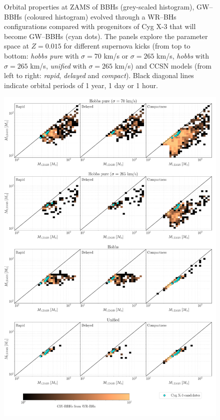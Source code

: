 \documentclass[a4paper,titlepage]{book}     	%
\begin{document}
\begin{appendices}
\begin{figure}
	\caption{Orbital properties at ZAMS of BBHs (grey-scaled histogram), GW--BBHs (coloured histogram) evolved through a WR--BHs configurations compared with progenitors of Cyg X-3 that will become GW--BBHs (cyan dots). The panels explore the parameter space at $Z=0.015$ for different supernova kicks (from top to bottom: \emph{hobbs pure} with $\sigma = 70$ km/s or $\sigma = 265$ km/s, \emph{hobbs} with $\sigma = 265$ km/s, \emph{unified} with $\sigma = 265$ km/s) and CCSN models (from left to right: \emph{rapid}, \emph{delayed} and \emph{compact}). Black diagonal lines indicate orbital periods of 1 year, 1 day or 1 hour.}\label{fig:resultsCygX3progbinaries}
\end{figure}

\begin{figure}
	\centering
	\includegraphics[width=\textwidth]{./images/kickcompare_progM1M2_015.pdf}	

\end{figure}
\end{appendices}
\end{document}
